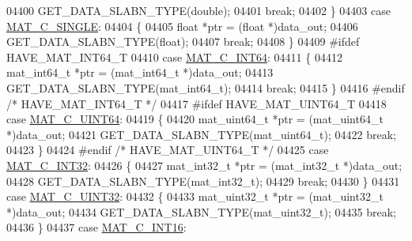 \begin{DoxyCode}
{{{{{{{{{{{{{{{{{{{{{{{{{04400                 GET\_DATA\_SLABN\_TYPE(\textcolor{keywordtype}{double});
04401                 \textcolor{keywordflow}{break};
04402             \}
04403             \textcolor{keywordflow}{case} \hyperlink{group___m_a_t_ggad4d60ae7b709fc81bfd744fb4c857c40a2825631e26a961cbe0f79db50a39cea2}{MAT\_C\_SINGLE}:
04404             \{
04405                 \textcolor{keywordtype}{float} *ptr = (\textcolor{keywordtype}{float} *)data\_out;
04406                 GET\_DATA\_SLABN\_TYPE(\textcolor{keywordtype}{float});
04407                 \textcolor{keywordflow}{break};
04408             \}
04409 \textcolor{preprocessor}{#ifdef HAVE\_MAT\_INT64\_T}
04410             \textcolor{keywordflow}{case} \hyperlink{group___m_a_t_ggad4d60ae7b709fc81bfd744fb4c857c40a1ea83bcde49b35477494412973f82409}{MAT\_C\_INT64}:
04411             \{
04412                 mat\_int64\_t *ptr = (mat\_int64\_t *)data\_out;
04413                 GET\_DATA\_SLABN\_TYPE(mat\_int64\_t);
04414                 \textcolor{keywordflow}{break};
04415             \}
04416 \textcolor{preprocessor}{#endif }\textcolor{comment}{/* HAVE\_MAT\_INT64\_T */}\textcolor{preprocessor}{}
04417 \textcolor{preprocessor}{#ifdef HAVE\_MAT\_UINT64\_T}
04418             \textcolor{keywordflow}{case} \hyperlink{group___m_a_t_ggad4d60ae7b709fc81bfd744fb4c857c40a86470e25c3763d9a24623f04326195dd}{MAT\_C\_UINT64}:
04419             \{
04420                 mat\_uint64\_t *ptr = (mat\_uint64\_t *)data\_out;
04421                 GET\_DATA\_SLABN\_TYPE(mat\_uint64\_t);
04422                 \textcolor{keywordflow}{break};
04423             \}
04424 \textcolor{preprocessor}{#endif }\textcolor{comment}{/* HAVE\_MAT\_UINT64\_T */}\textcolor{preprocessor}{}
04425             \textcolor{keywordflow}{case} \hyperlink{group___m_a_t_ggad4d60ae7b709fc81bfd744fb4c857c40adb44fc39694e3152ae5e69470a2fefe8}{MAT\_C\_INT32}:
04426             \{
04427                 mat\_int32\_t *ptr = (mat\_int32\_t *)data\_out;
04428                 GET\_DATA\_SLABN\_TYPE(mat\_int32\_t);
04429                 \textcolor{keywordflow}{break};
04430             \}
04431             \textcolor{keywordflow}{case} \hyperlink{group___m_a_t_ggad4d60ae7b709fc81bfd744fb4c857c40a9a17a7edd45b19ef68197db81b27e816}{MAT\_C\_UINT32}:
04432             \{
04433                 mat\_uint32\_t *ptr = (mat\_uint32\_t *)data\_out;
04434                 GET\_DATA\_SLABN\_TYPE(mat\_uint32\_t);
04435                 \textcolor{keywordflow}{break};
04436             \}
04437             \textcolor{keywordflow}{case} \hyperlink{group___m_a_t_ggad4d60ae7b709fc81bfd744fb4c857c40a40370e9de516c5036a67a5865c071006}{MAT\_C\_INT16}:
}}}}}}}}}}}}}}}}}}}}}}}}}
\end{DoxyCode}
